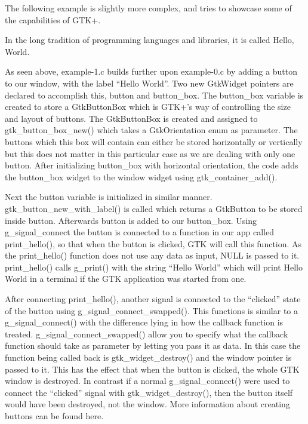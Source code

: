 \documentclass[a4paper,openany,twoside,final]{book}
\begin{document}
The following example is slightly more complex, and tries to showcase some of the capabilities of GTK+.

In the long tradition of programming languages and libraries, it is called Hello, World.

As seen above, example-1.c builds further upon example-0.c by adding a button to our window, with the label ``Hello World''. Two new GtkWidget pointers are declared to accomplish this, button and button\_box. The button\_box variable is created to store a GtkButtonBox which is GTK+'s way of controlling the size and layout of buttons. The GtkButtonBox is created and assigned to gtk\_button\_box\_new() which takes a GtkOrientation enum as parameter. The buttons which this box will contain can either be stored horizontally or vertically but this does not matter in this particular case as we are dealing with only one button. After initializing button\_box with horizontal orientation, the code adds the button\_box widget to the window widget using gtk\_container\_add().

Next the button variable is initialized in similar manner. gtk\_button\_new\_with\_label() is called which returns a GtkButton to be stored inside button. Afterwards button is added to our button\_box. Using g\_signal\_connect the button is connected to a function in our app called print\_hello(), so that when the button is clicked, GTK will call this function. As the print\_hello() function does not use any data as input, NULL is passed to it. print\_hello() calls g\_print() with the string ``Hello World'' which will print Hello World in a terminal if the GTK application was started from one.

After connecting print\_hello(), another signal is connected to the ``clicked'' state of the button using g\_signal\_connect\_swapped(). This functions is similar to a g\_signal\_connect() with the difference lying in how the callback function is treated. g\_signal\_connect\_swapped() allow you to specify what the callback function should take as parameter by letting you pass it as data. In this case the function being called back is gtk\_widget\_destroy() and the window pointer is passed to it. This has the effect that when the button is clicked, the whole GTK window is destroyed. In contrast if a normal g\_signal\_connect() were used to connect the ``clicked'' signal with gtk\_widget\_destroy(), then the button itself would have been destroyed, not the window. More information about creating buttons can be found here.
\end{document}
